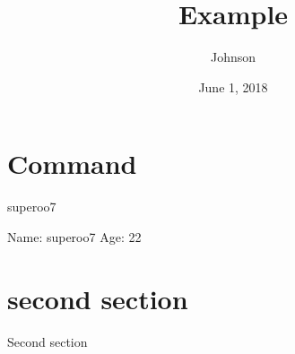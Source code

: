 \documentclass[a4paper,11pt]{article}
\begin{document}
\title{Example}
\author{Johnson}
\date{June 1, 2018}
\maketitle
\section{Command}

\newcommand{\name}{superoo7}

\newcommand{\data}[2][\bfseries]{{Name: #1  Age: #2}}

\name

\data[\name]{22}

\section{second section}
Second section
\end{document}
